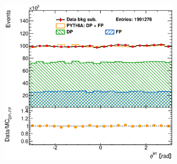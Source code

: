 \documentclass[12pt, twoside]{article}
\numberwithin{equation}{section}
\numberwithin{figure}{section}
\newenvironment{changemargin}[2]{%
\begin{list}{}{%
\setlength{\topsep}{0pt}%
\setlength{\leftmargin}{#1}%
\setlength{\rightmargin}{#2}%
\setlength{\listparindent}{\parindent}%
\setlength{\itemindent}{\parindent}%
\setlength{\parsep}{\parskip}%
}%
\item[]}{\end{list}}
\begin{document}
\begin{figure}
\begin{changemargin}{-1.0cm}{-0.75cm}
\begin{changemargin}{-0.75cm}{-1.0cm}
\begin{subfigure}[b]{0.37\textwidth}
            \subcaption{}
            \label{fig:BSRapidityJetPYTHIA}
        \end{subfigure}
        \begin{subfigure}[b]{0.37\textwidth}
            \includegraphics[width=\textwidth]{./images/BackgroundSubtractedPythia/SIG_EVENTS-106.eps}
            \subcaption{}
            \label{fig:BSPhiJetPYTHIA}
        \end{subfigure}


\end{changemargin}
\end{changemargin}
\end{figure}
\end{document}
